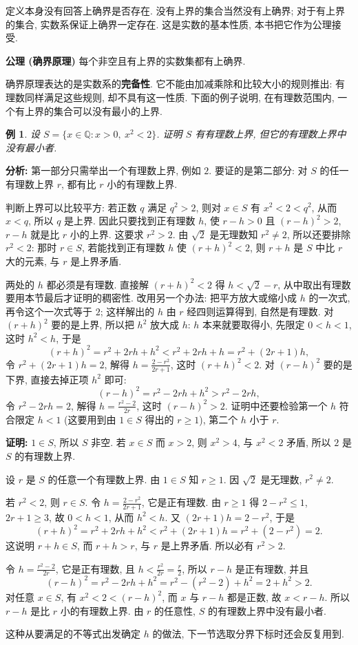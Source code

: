 \documentclass[UTF8,openany]{ctexbook}
\theoremstyle{chinesetextbook}
\newtheorem{example}{例}[section]
\newenvironment{cnproof}{\par\indent\textbf{证明:} \ignorespaces}{\par}
\begin{document}
定义本身没有回答上确界是否存在. 没有上界的集合当然没有上确界; 对于有上界的集合, 实数系保证上确界一定存在. 这是实数的基本性质, 本书把它作为公理接受.

\par\indent\textbf{公理 (确界原理)} 每个非空且有上界的实数集都有上确界.

确界原理表达的是实数系的\textbf{完备性}. 它不能由加减乘除和比较大小的规则推出: 有理数同样满足这些规则, 却不具有这一性质. 下面的例子说明, 在有理数范围内, 一个有上界的集合可以没有最小的上界.
\begin{example}
设 $S=\{x\in\mathbb Q:x>0,\ x^2<2\}$. 证明 $S$ 有有理数上界, 但它的有理数上界中没有最小者.
\end{example}
\par\indent\textbf{分析:} 第一部分只需举出一个有理数上界, 例如 $2$. 要证的是第二部分: 对 $S$ 的任一有理数上界 $r$, 都有比 $r$ 小的有理数上界.

判断上界可以比较平方: 若正数 $q$ 满足 $q^2>2$, 则对 $x\in S$ 有 $x^2<2<q^2$, 从而 $x<q$, 所以 $q$ 是上界. 因此只要找到正有理数 $h$, 使 $r-h>0$ 且 $(r-h)^2>2$, $r-h$ 就是比 $r$ 小的上界. 这要求 $r^2>2$. 由 $\sqrt2$ 是无理数知 $r^2\ne2$, 所以还要排除 $r^2<2$: 那时 $r\in S$, 若能找到正有理数 $h$ 使 $(r+h)^2<2$, 则 $r+h$ 是 $S$ 中比 $r$ 大的元素, 与 $r$ 是上界矛盾.

两处的 $h$ 都必须是有理数. 直接解 $(r+h)^2<2$ 得 $h<\sqrt2-r$, 从中取出有理数要用本节最后才证明的稠密性. 改用另一个办法: 把平方放大或缩小成 $h$ 的一次式, 再令这个一次式等于 $2$; 这样解出的 $h$ 由 $r$ 经四则运算得到, 自然是有理数. 对 $(r+h)^2$ 要的是上界, 所以把 $h^2$ 放大成 $h$: $h$ 本来就要取得小, 先限定 $0<h<1$, 这时 $h^2<h$, 于是
\[
(r+h)^2=r^2+2rh+h^2<r^2+2rh+h=r^2+(2r+1)h,
\]
令 $r^2+(2r+1)h=2$, 解得 $\displaystyle h=\frac{2-r^2}{2r+1}$, 这时 $(r+h)^2<2$. 对 $(r-h)^2$ 要的是下界, 直接去掉正项 $h^2$ 即可:
\[
(r-h)^2=r^2-2rh+h^2>r^2-2rh,
\]
令 $r^2-2rh=2$, 解得 $\displaystyle h=\frac{r^2-2}{2r}$, 这时 $(r-h)^2>2$. 证明中还要检验第一个 $h$ 符合限定 $h<1$ (这要用到由 $1\in S$ 得出的 $r\ge1$), 第二个 $h$ 小于 $r$.
\begin{cnproof}
$1\in S$, 所以 $S$ 非空. 若 $x\in S$ 而 $x>2$, 则 $x^2>4$, 与 $x^2<2$ 矛盾, 所以 $2$ 是 $S$ 的有理数上界.

设 $r$ 是 $S$ 的任意一个有理数上界. 由 $1\in S$ 知 $r\ge1$. 因 $\sqrt2$ 是无理数, $r^2\ne2$.

若 $r^2<2$, 则 $r\in S$. 令 $\displaystyle h=\frac{2-r^2}{2r+1}$, 它是正有理数. 由 $r\ge1$ 得 $2-r^2\le1$, $2r+1\ge3$, 故 $0<h<1$, 从而 $h^2<h$. 又 $(2r+1)h=2-r^2$, 于是
\[
(r+h)^2=r^2+2rh+h^2<r^2+(2r+1)h=r^2+(2-r^2)=2.
\]
这说明 $r+h\in S$, 而 $r+h>r$, 与 $r$ 是上界矛盾. 所以必有 $r^2>2$.

令 $\displaystyle h=\frac{r^2-2}{2r}$, 它是正有理数, 且 $\displaystyle h<\frac{r^2}{2r}=\frac r2$, 所以 $r-h$ 是正有理数, 并且
\[
(r-h)^2=r^2-2rh+h^2=r^2-(r^2-2)+h^2=2+h^2>2.
\]
对任意 $x\in S$, 有 $x^2<2<(r-h)^2$, 而 $x$ 与 $r-h$ 都是正数, 故 $x<r-h$. 所以 $r-h$ 是比 $r$ 小的有理数上界. 由 $r$ 的任意性, $S$ 的有理数上界中没有最小者.
\end{cnproof}
这种从要满足的不等式出发确定 $h$ 的做法, 下一节选取分界下标时还会反复用到.
\end{document}
